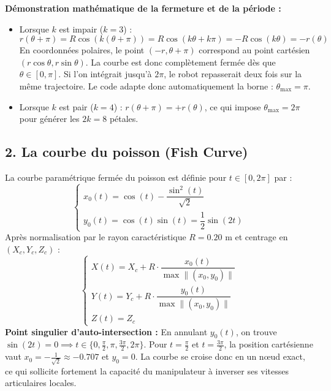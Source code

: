 \documentclass[11pt,a4paper]{report}
\begin{document}
\textbf{Démonstration mathématique de la fermeture et de la période :}
\begin{itemize}
    \item Lorsque $k$ est impair ($k = 3$) :
    \begin{equation}
        r(\theta + \pi) = R \cos(k(\theta + \pi)) = R \cos(k\theta + k\pi) = -R \cos(k\theta) = -r(\theta)
    \end{equation}
    En coordonnées polaires, le point $(-r, \theta + \pi)$ correspond au point cartésien $(r\cos\theta, r\sin\theta)$. La courbe est donc complètement fermée dès que $\theta \in [0, \pi]$. Si l'on intégrait jusqu'à $2\pi$, le robot repasserait deux fois sur la même trajectoire. Le code adapte donc automatiquement la borne : $\theta_{\max} = \pi$.
    \item Lorsque $k$ est pair ($k = 4$) : $r(\theta + \pi) = +r(\theta)$, ce qui impose $\theta_{\max} = 2\pi$ pour générer les $2k = 8$ pétales.
\end{itemize}

\subsection{2. La courbe du poisson (Fish Curve)}
La courbe paramétrique fermée du poisson est définie pour $t \in [0, 2\pi]$ par :
\begin{equation}
    \begin{cases}
        x_0(t) = \cos(t) - \dfrac{\sin^2(t)}{\sqrt{2}} \\[0.2cm]
        y_0(t) = \cos(t) \sin(t) = \dfrac{1}{2}\sin(2t)
    \end{cases}
\end{equation}
Après normalisation par le rayon caractéristique $R = 0.20\text{ m}$ et centrage en $(X_c, Y_c, Z_c)$ :
\begin{equation}
    \begin{cases}
        X(t) = X_c + R \cdot \dfrac{x_0(t)}{\max \|(x_0, y_0)\|} \\[0.2cm]
        Y(t) = Y_c + R \cdot \dfrac{y_0(t)}{\max \|(x_0, y_0)\|} \\[0.2cm]
        Z(t) = Z_c
    \end{cases}
\end{equation}
\textbf{Point singulier d'auto-intersection :} En annulant $y_0(t)$, on trouve $\sin(2t) = 0 \implies t \in \{0, \frac{\pi}{2}, \pi, \frac{3\pi}{2}, 2\pi\}$. Pour $t = \frac{\pi}{2}$ et $t = \frac{3\pi}{2}$, la position cartésienne vaut $x_0 = -\frac{1}{\sqrt{2}} \approx -0.707$ et $y_0 = 0$. La courbe se croise donc en un nœud exact, ce qui sollicite fortement la capacité du manipulateur à inverser ses vitesses articulaires locales.
\end{document}
